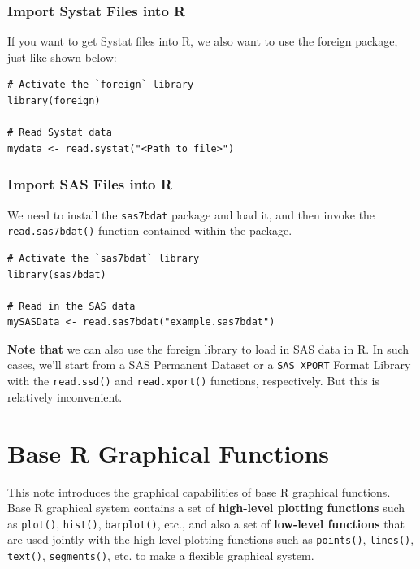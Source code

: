 \documentclass[
]{book}
\begin{document}
\hypertarget{import-systat-files-into-r}{%
\subsection{Import Systat Files into R}\label{import-systat-files-into-r}}

If you want to get Systat files into R, we also want to use the foreign package, just like shown below:

\begin{verbatim}
# Activate the `foreign` library
library(foreign)

# Read Systat data
mydata <- read.systat("<Path to file>") 
\end{verbatim}

\hypertarget{import-sas-files-into-r}{%
\subsection{Import SAS Files into R}\label{import-sas-files-into-r}}

We need to install the \texttt{sas7bdat} package and load it, and then invoke the \texttt{read.sas7bdat()} function contained within the package.

\begin{verbatim}
# Activate the `sas7bdat` library
library(sas7bdat)

# Read in the SAS data
mySASData <- read.sas7bdat("example.sas7bdat")
\end{verbatim}

\textbf{Note that} we can also use the foreign library to load in SAS data in R. In such cases, we'll start from a SAS Permanent Dataset or a \texttt{SAS\ XPORT} Format Library with the \texttt{read.ssd()} and \texttt{read.xport()} functions, respectively. But this is relatively inconvenient.

\hypertarget{base-r-graphical-functions}{%
\chapter{Base R Graphical Functions}\label{base-r-graphical-functions}}

This note introduces the graphical capabilities of base R graphical functions. Base R graphical system contains a set of \textbf{high-level plotting functions} such as \texttt{plot()}, \texttt{hist()}, \texttt{barplot()}, etc., and also a set of \textbf{low-level functions} that are used jointly with the high-level plotting functions such as \texttt{points()}, \texttt{lines()}, \texttt{text()}, \texttt{segments()}, etc. to make a flexible graphical system.
\end{document}
